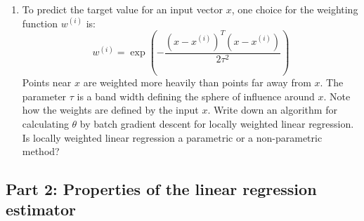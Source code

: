 \documentclass[]{book}
\theoremstyle{definition}
\begin{document}
\begin{enumerate}
	\item To predict the target value for an input vector $x$, one choice for the weighting function $w^{(i)}$ is:
	$$w^{(i)}= \exp({-\frac{(x -x^{(i)})^T (x-x^{(i)})}{2 \tau^2}})$$
	Points near $x$ are weighted more heavily than points far away from $x$. The parameter $\tau$ is a band width defining the sphere of influence around $x$. Note how the weights are defined by the input $x$. Write down an algorithm for calculating $\theta$ by batch gradient descent for locally weighted linear regression. Is locally weighted linear regression a parametric or a non-parametric method?
\end{enumerate}

\subsection*{Part 2: Properties of the linear regression estimator}
\end{document}

